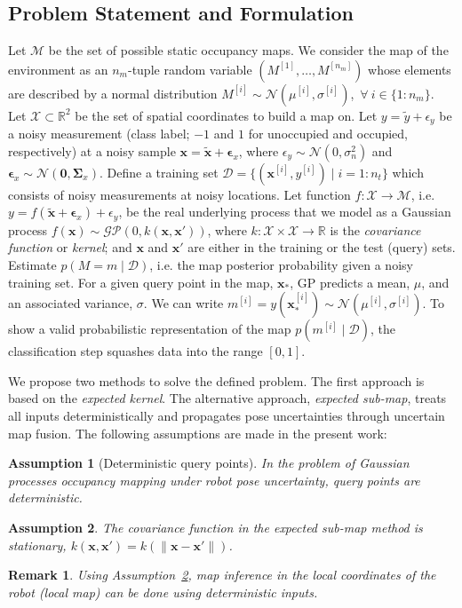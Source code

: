 \documentclass[letterpaper, 10 pt, journal, twoside]{IEEEtran}  %
\newtheorem{remark}{Remark}
\newtheorem{assumption}{Assumption}
\begin{document}
\subsection{Problem Statement and Formulation}
\label{subsec:problemuin}
Let $\mathcal{M}$ be the set of possible static occupancy maps. We consider the map of the environment as an $n_m$-tuple random variable \mbox{$(M^{[1]},\dots,M^{[n_m]})$} whose elements are described by a normal distribution \mbox{$M^{[i]} \sim \mathcal{N}(\mu^{[i]},\sigma^{[i]})$, $\forall \ i \in \{1\colon n_m\}$}. Let $\mathcal{X} \subset \mathbb{R}^2$ be the set of spatial coordinates to build a map on. Let \mbox{$y = \tilde{y} + \epsilon_y$} be a noisy measurement (class label; $-1$ and $1$ for unoccupied and occupied, respectively) at a noisy sample \mbox{$\boldsymbol x = \boldsymbol{\tilde{x}} + \boldsymbol\epsilon_x$}, where \mbox{$\epsilon_y \sim \mathcal{N}(0,\sigma_n^2)$} and \mbox{$\boldsymbol\epsilon_x \sim \mathcal{N}(\boldsymbol 0,\boldsymbol\Sigma_x)$}. Define a training set \mbox{$\mathcal{D} = \{(\boldsymbol x^{[i]},y^{[i]}) \mid i=1\colon n_t\}$} which consists of noisy measurements at noisy locations. Let function \mbox{$f:\mathcal{X}\rightarrow\mathcal{M}$}, i.e. \mbox{$y = f(\boldsymbol{\tilde{x}} + \boldsymbol\epsilon_x) + \epsilon_y$}, be the real underlying process that we model as a Gaussian process \mbox{$f(\boldsymbol x) \sim \mathcal{GP}(0, k(\boldsymbol x,\boldsymbol x'))$}, where \mbox{$k:\mathcal{X} \times \mathcal{X} \rightarrow \mathbb{R}$} is the \emph{covariance function} or \emph{kernel}; and $\boldsymbol x$ and $\boldsymbol x'$ are either in the training or the test (query) sets.
Estimate \mbox{$p(M=m\mid \mathcal{D})$}, i.e. the map posterior probability given a noisy training set. For a given query point in the map, $\boldsymbol x_*$, GP predicts a mean, $\mu$, and an associated variance, $\sigma$. We can write \mbox{$m^{[i]} = y(\boldsymbol x^{[i]}_*) \sim \mathcal{N}(\mu^{[i]},\sigma^{[i]})$}.
To show a valid probabilistic representation of the map $p(m^{[i]}\mid \mathcal{D})$, the classification step squashes data into the range $[0,1]$.

We propose two methods to solve the defined problem. The first approach is based on the \textit{expected kernel}. The alternative approach, \textit{expected sub-map}, treats all inputs deterministically and propagates pose uncertainties through uncertain map fusion. The following assumptions are made in the present work:
\begin{assumption}[Deterministic query points]
 In the problem of Gaussian processes occupancy mapping under robot pose uncertainty, query points are deterministic.
\end{assumption}
\begin{assumption}
\label{assump:statcov}
 The covariance function in the expected sub-map method is stationary, $k(\boldsymbol x, \boldsymbol x')=k(\lVert \boldsymbol x - \boldsymbol x' \rVert)$.
\end{assumption}
\begin{remark}
 Using Assumption~\ref{assump:statcov}, map inference in the local coordinates of the robot (local map) can be done using deterministic inputs.
\end{remark}
\end{document}
